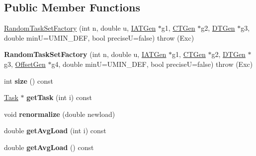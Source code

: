 \subsection*{Public Member Functions}
\begin{DoxyCompactItemize}
\item 
\hyperlink{classRTSim_1_1RandomTaskSetFactory_a150a7413f1c4c216896fa2c025078025}{Random\+Task\+Set\+Factory} (int n, double u, \hyperlink{classRTSim_1_1IATGen}{I\+A\+T\+Gen} $\ast$g1, \hyperlink{classRTSim_1_1CTGen}{C\+T\+Gen} $\ast$g2, \hyperlink{classRTSim_1_1DTGen}{D\+T\+Gen} $\ast$g3, double minU=U\+M\+I\+N\+\_\+\+D\+EF, bool preciseU=false)  throw (\+Exc)
\item 
{\bfseries Random\+Task\+Set\+Factory} (int n, double u, \hyperlink{classRTSim_1_1IATGen}{I\+A\+T\+Gen} $\ast$g1, \hyperlink{classRTSim_1_1CTGen}{C\+T\+Gen} $\ast$g2, \hyperlink{classRTSim_1_1DTGen}{D\+T\+Gen} $\ast$g3, \hyperlink{classRTSim_1_1OffsetGen}{Offset\+Gen} $\ast$g4, double minU=U\+M\+I\+N\+\_\+\+D\+EF, bool preciseU=false)  throw (\+Exc)\hypertarget{classRTSim_1_1RandomTaskSetFactory_adb43888a9612b91b50f322518afe43d6}{}\label{classRTSim_1_1RandomTaskSetFactory_adb43888a9612b91b50f322518afe43d6}

\item 
int {\bfseries size} () const \hypertarget{classRTSim_1_1RandomTaskSetFactory_a2b4af409242fdb562a8a7eec79902b57}{}\label{classRTSim_1_1RandomTaskSetFactory_a2b4af409242fdb562a8a7eec79902b57}

\item 
\hyperlink{classRTSim_1_1Task}{Task} $\ast$ {\bfseries get\+Task} (int i) const \hypertarget{classRTSim_1_1RandomTaskSetFactory_ab7d9e83ad151b4fb7735e665ca3001eb}{}\label{classRTSim_1_1RandomTaskSetFactory_ab7d9e83ad151b4fb7735e665ca3001eb}

\item 
void {\bfseries renormalize} (double newload)\hypertarget{classRTSim_1_1RandomTaskSetFactory_a67cc9aa43654aa94663233b0867d09fc}{}\label{classRTSim_1_1RandomTaskSetFactory_a67cc9aa43654aa94663233b0867d09fc}

\item 
double {\bfseries get\+Avg\+Load} (int i) const \hypertarget{classRTSim_1_1RandomTaskSetFactory_a14b51167b1c16eca9e6b2c1a20053189}{}\label{classRTSim_1_1RandomTaskSetFactory_a14b51167b1c16eca9e6b2c1a20053189}

\item 
double {\bfseries get\+Avg\+Load} () const \hypertarget{classRTSim_1_1RandomTaskSetFactory_a2eba91bc9b065110853fd13cf966568c}{}\label{classRTSim_1_1RandomTaskSetFactory_a2eba91bc9b065110853fd13cf966568c}


\end{DoxyCompactItemize}
